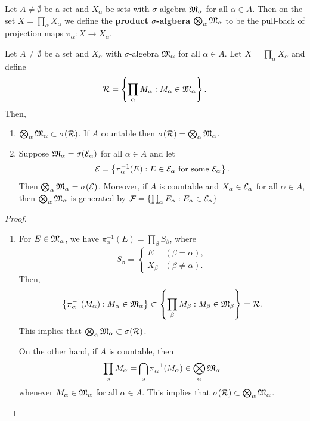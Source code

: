 \documentclass[a4paper]{article}
\begin{document}
\begin{defi}
  Let $A \neq \emptyset$ be a set and $X_\alpha$ be sets 
  with $\sigma$-algebra $\mathfrak{M}_\alpha$ for all 
    $\alpha \in A$. Then on the set $X = \prod_\alpha X_\alpha$
    we define the \textbf{product $\sigma$-algbera} 
    $\bigotimes_\alpha \mathfrak{M}_\alpha$ to be the 
    pull-back of projection maps 
    $\pi_\alpha : X \to X_\alpha$.
\end{defi}
{
\begin{thm}
  Let $A \neq \emptyset$ be a set and $X_\alpha$ 
  with $\sigma$-algebra $\mathfrak{M}_\alpha$ for all $\alpha 
  \in A$. Let $X = \prod_\alpha X_\alpha$ and 
  define 
  \[
  \mathcal{R} = \left\{ \prod_\alpha M_\alpha: 
  M_\alpha \in \mathfrak{M}_\alpha \right\}.
  \]
  Then, 
  \begin{enumerate}
    \item $\bigotimes_\alpha \mathfrak{M}_\alpha \subset \sigma 
    (\mathcal{R})$. If $A$ countable then $\sigma(\mathcal{R}) 
    = \bigotimes_\alpha \mathfrak{M}_\alpha$.
    
    \item Suppose $\mathfrak{M}_\alpha = \sigma(\mathcal{E}_\alpha)$
    for all $\alpha \in A$ and let 
    \[
    \mathcal{E} = \left\{ \pi_\alpha^{-1}(E) : 
    E \in \mathcal{E}_\alpha \text{ for some $\mathcal{E}_\alpha$} \right\}.
    \]
    Then $\bigotimes_\alpha \mathfrak{M}_\alpha = \sigma(\mathcal{E})$. 
    Moreover, if $A$ is countable and $X_\alpha \in \mathcal{E}_\alpha$
    for all $\alpha \in A$, then $\bigotimes_\alpha \mathfrak{M}_\alpha$
    is generated by $\mathcal{F} = \left\{ \prod_\alpha E_\alpha :
    E_\alpha \in \mathcal{E}_\alpha \right\}$
  \end{enumerate}
\end{thm}

\begin{proof}
\begin{enumerate}
\item For $E \in \mathfrak{M}_\alpha$, we have 
$\pi^{-1}_\alpha (E) = \prod_\beta S_\beta$, where 
\[
S_\beta = \begin{cases}
  E & (\beta = \alpha), \\ 
  X_\beta & (\beta \neq \alpha).
\end{cases}
\]
Then, 
\[
\left\{ \pi_\alpha^{-1}(M_\alpha) : M_\alpha 
\in \mathfrak{M}_\alpha \right\}
\subset \left\{ \prod_\beta M_\beta: M_\beta \in 
\mathfrak{M}_\beta \right\} = \mathcal{R}.
\]
This implies that $\bigotimes_\alpha \mathfrak{M}_\alpha \subset 
\sigma(\mathcal{R})$.

On the other hand, if $A$ is countable, then 
\[
\prod_\alpha M_\alpha = 
\bigcap_\alpha \pi_\alpha^{-1} (M_\alpha) 
\in \bigotimes_\alpha \mathfrak{M}_\alpha
\]
whenever $M_\alpha \in \mathfrak{M}_\alpha$ for all $\alpha \in A$.
This implies that $\sigma(\mathcal{R}) \subset \bigotimes_\alpha 
\mathfrak{M}_\alpha$.


\end{enumerate}
\end{proof}}
\end{document}
